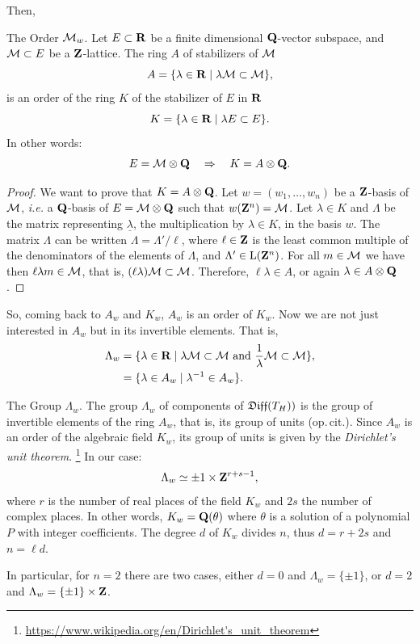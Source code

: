 Then,

\begin{Article}{The Order $\mathcal{M}_w$.}{}
  Let $E \subset \mathbf{R}$ be a finite dimensional $\mathbf{Q}$-vector subspace,
  and $\mathcal{M} \subset E$ be a $\mathbf{Z}$-lattice.
  The ring $A$ of stabilizers of $\mathcal{M}$
  $$%
    A  = \{ \lambda \in \RR \mid \lambda \cM \subset \cM \},
    $$%
  is an order of the ring $K$ of the stabilizer of $E$ in $\mathbf{R}$
  $$%
    K = \{ \lambda \in \RR \mid \lambda E \subset E \}.
    $$%
  In other words:
  $$%
    E = \cM \otimes \QQ \quad \Rightarrow \quad K = A \otimes \QQ.
    $$%
\end{Article}

\begin{proof}
  We want to prove that $K = A \otimes \mathbf{Q}$.
  Let $w=(w_1,\ldots,w_n)$ be a $\mathbf{Z}$-basis of $\mathcal{M}$,
  {\itshape i.e.}\/ a $\mathbf{Q}$-basis of $E = \mathcal{M} \otimes \mathbf{Q}$ such that $w(\mathbf{Z}^n)=\mathcal{M}$.
  Let $\lambda \in K$ and $\Lambda$ be the matrix representing $\underline\lambda$,
  the multiplication by $\lambda \in K$,
  in the basis $w$.
  The matrix $\Lambda$ can be written $\Lambda = \Lambda'/\ell$,
  where $\ell \in \mathbf{Z}$ is the least common multiple of the denominators of the elements of $\Lambda$,
  and  $\Lambda' \in \operatorname{L}(\mathbf{Z}^n)$.
  For all $m \in \mathcal{M}$ we have then $\ell \lambda m \in \mathcal{M}$,
  that is,
  $(\ell\lambda) \mathcal{M} \subset \mathcal{M}$.
  Therefore,
  $\ell \lambda \in A$,
  or again $\lambda \in A \otimes \mathbf{Q}$.
\end{proof}

So,
coming back to $A_w$ and $K_w$,
$A_w$ is an order of $K_w$.
Now we are not just interested in $A_w$ but in its invertible elements.
That is,
\begin{align*}
  \Lambda_w & = \{ \lambda \in \mathbf{R} \mid \lambda \mathcal{M} \subset \mathcal{M} \text{ and } {1 \over \lambda} \mathcal{M} \subset \mathcal{M} \}, \\
  & = \{ \lambda \in A_w \mid \lambda^{-1} \in A_w \}.
\end{align*}

\begin{Article}{The Group $\Lambda_w$.}{}
  The group $\Lambda_w$ of components of $\mathfrak{Diff}(T_H))$ is the group of invertible elements of the ring $A_w$,
  that is,
  its group of units (op.\,cit.).
  Since $A_w$ is an order of the algebraic field $K_w$,
  its group of units is given by the \emph{Dirichlet's unit theorem}.%
  \footnote{\url{https://www.wikipedia.org/en/Dirichlet's_unit_theorem}}
  In our case:
  $$%
    \Lambda_w \simeq {\pm1} \times \ZZ^{r+s-1},
    $$%
  where $r$ is the number of real places of the field $K_w$ and $2s$ the number of complex places.
  In other words,
  $K_w = \mathbf{Q}(\theta)$ where $\theta$ is a solution of a polynomial $P$ with integer coefficients.
  The degree $d$ of $K_w$ divides $n$,
  thus $d = r + 2s$ and $n = \ell d$.
  
  \Note In particular,
  for $n = 2$ there are two cases,
  either $d = 0$ and $\Lambda_w = \{\pm1\}$,
  or $d = 2$ and $\Lambda_w = \{\pm1\} \times \mathbf{Z}$.
\end{Article}

